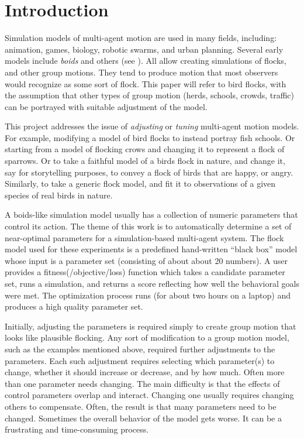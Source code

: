 \documentclass[letterpaper]{article}
\begin{document}

\section{Introduction}
\label{sec:intro}

Simulation models of multi-agent motion are used in many fields, including: animation, games, biology, robotic swarms, and urban planning. Several early models include \textit{boids} \citep{reynolds_flocks_1987} and others (see ). All allow creating simulations of flocks, and other group motions.  They tend to produce motion that most observers would recognize as some sort of flock. This paper will refer to bird flocks, with the assumption that other types of group motion (herds, schools, crowds, traffic) can be portrayed with suitable adjustment of the model.

This project addresses the issue of \textit{adjusting} or \textit{tuning} multi-agent motion models. For example, modifying a model of bird flocks to instead portray fish schools. Or starting from a model of flocking crows and changing it to represent a flock of sparrows. Or to take a faithful model of a birds flock in nature, and change it, say for storytelling purposes, to convey a flock of birds that are happy, or angry. Similarly, to take a generic flock model, and fit it to observations of a given species of real birds in nature.

A boids-like simulation model usually has a collection of numeric parameters that control its action. The theme of this work is to automatically determine a set of near-optimal parameters for a simulation-based multi-agent system. The flock model used for these experiments is a predefined hand-written ``black box'' model whose input is a parameter set (consisting of about about 20 numbers). A user provides a fitness(/objective/loss) function which takes a candidate parameter set, runs a simulation, and returns a score reflecting how well the behavioral goals were met. The optimization process runs (for about two hours on a laptop) and produces a high quality parameter set.

Initially, adjusting the parameters is required simply to create group motion that looks like plausible flocking. Any sort of modification to a group motion model, such as the examples mentioned above, required further adjustments to the parameters. Each such adjustment requires selecting which parameter(s) to change, whether it should increase or decrease, and by how much. Often more than one parameter needs changing. The main difficulty is that the effects of control parameters overlap and interact. Changing one usually requires changing others to compensate. Often, the result is that many parameters need to be changed. Sometimes the overall behavior of the model gets worse. It can be a frustrating and time-consuming process.
\end{document}
